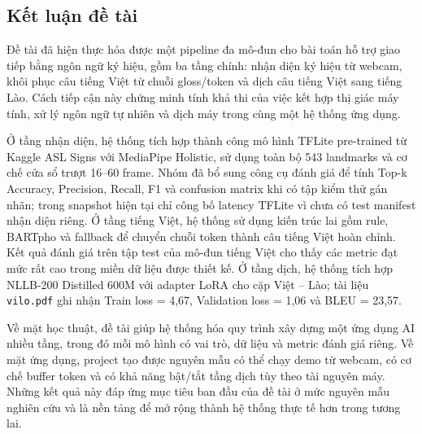 ﻿\subsection{Kết luận đề tài}

Đề tài đã hiện thực hóa được một pipeline đa mô-đun cho bài toán hỗ trợ giao tiếp bằng ngôn ngữ ký hiệu, gồm ba tầng chính: nhận diện ký hiệu từ webcam, khôi phục câu tiếng Việt từ chuỗi gloss/token và dịch câu tiếng Việt sang tiếng Lào. Cách tiếp cận này chứng minh tính khả thi của việc kết hợp thị giác máy tính, xử lý ngôn ngữ tự nhiên và dịch máy trong cùng một hệ thống ứng dụng.

Ở tầng nhận diện, hệ thống tích hợp thành công mô hình TFLite pre-trained từ Kaggle ASL Signs với MediaPipe Holistic, sử dụng toàn bộ 543 landmarks và cơ chế cửa sổ trượt 16--60 frame. Nhóm đã bổ sung công cụ đánh giá để tính Top-k Accuracy, Precision, Recall, F1 và confusion matrix khi có tập kiểm thử gán nhãn; trong snapshot hiện tại chỉ công bố latency TFLite vì chưa có test manifest nhận diện riêng. Ở tầng tiếng Việt, hệ thống sử dụng kiến trúc lai gồm rule, BARTpho và fallback để chuyển chuỗi token thành câu tiếng Việt hoàn chỉnh. Kết quả đánh giá trên tập test của mô-đun tiếng Việt cho thấy các metric đạt mức rất cao trong miền dữ liệu được thiết kế. Ở tầng dịch, hệ thống tích hợp NLLB-200 Distilled 600M với adapter LoRA cho cặp Việt -- Lào; tài liệu \texttt{vilo.pdf} ghi nhận Train loss = 4,67, Validation loss = 1,06 và BLEU = 23,57.

Về mặt học thuật, đề tài giúp hệ thống hóa quy trình xây dựng một ứng dụng AI nhiều tầng, trong đó mỗi mô hình có vai trò, dữ liệu và metric đánh giá riêng. Về mặt ứng dụng, project tạo được nguyên mẫu có thể chạy demo từ webcam, có cơ chế buffer token và có khả năng bật/tắt tầng dịch tùy theo tài nguyên máy. Những kết quả này đáp ứng mục tiêu ban đầu của đề tài ở mức nguyên mẫu nghiên cứu và là nền tảng để mở rộng thành hệ thống thực tế hơn trong tương lai.

